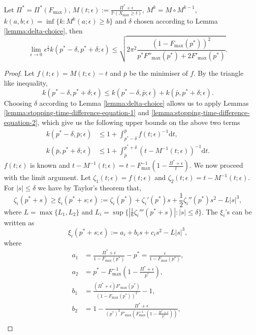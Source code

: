 \documentclass[11pt,a4paper]{article}
\numberwithin{equation}{section}
\begin{document}
\begin{lemma}\label{lemma:technical-upperbound-argument}
Let $\Pi^*=\Pi^*(F_{\max})$, $M(t;\epsilon):=\frac{\Pi^*+\epsilon}{\mathbb{P}(X_{\max}\ge t)}$, $M^k=M\circ M^{k-1}$, $k(a,b;\epsilon)=\inf\{k:M^k(a;\epsilon)\ge b\}$ and $\delta$ chosen according to Lemma \ref{lemma:delta-choice}, then 
    $$
    \lim_{\epsilon\to 0}\epsilon^{\frac{1}{2}}k(p^*-\delta,p^*+\delta;\epsilon)\le\sqrt{2\pi^2\frac{(1-F_{\max}(p^*))^2}{p^*F''_{\max}(p^*)+2F'_{\max}(p^*)}}.
    $$
\end{lemma}
\begin{proof}
    Let $f(t;\epsilon)=M(t;\epsilon)-t$ and $\bar{p}$ be the minimiser of $f$. By the triangle like inequality,
    $$
    k(p^*-\delta,p^*+\delta;\epsilon)\le k(p^*-\delta,\bar{p};\epsilon)+k(\bar{p},p^*+\delta;\epsilon).
    $$
    Choosing $\delta$ according to Lemma \ref{lemma:delta-choice} allows us to apply Lemmas \ref{lemma:stopping-time-difference-equation-1} and \ref{lemma:stopping-time-difference-equation-2}, which give us the following upper bounds on the above two terms
    \begin{align}
        k(p^*-\delta,\bar{p};\epsilon)&\le 1+\int_{p^*-\delta}^{\bar{p}}f(t;\epsilon)^{-1}\mathrm{d}t,\label{eq:bound-left}\\
        k(\bar{p},p^*+\delta;\epsilon)&\le1+\int_{\bar{p}}^{p^*+\delta}\left(t-M^{-1}(t;\epsilon)\right)^{-1}\mathrm{d}t.\label{eq:bound-right}
    \end{align}
    $f(t;\epsilon)$ is known and $t-M^{-1}(t;\epsilon)=t-F^{-1}_{\max}\left(1-\frac{\Pi^*+\epsilon}{t}\right)$.
    We now proceed with the limit argument.    
    Let $\zeta_1(t;\epsilon)=f(t;\epsilon)$ and $\zeta_2(t;\epsilon)=t-M^{-1}(t;\epsilon)$. For $|s|\le \delta$ we have by Taylor's theorem that,
    $$
    \zeta_i(p^*+s)\ge\xi_i(p^*+s;\epsilon):=\zeta_i(p^*)+\zeta_i'(p^*)s+\frac{1}{2}\zeta_i''(p^*)s^2-L|s|^3, 
    $$
    where $L=\max\{L_1,L_2\}$ and $L_i=\sup\{|\frac{1}{6}\zeta_i'''(p^*+s)|:|s|\le\delta\}$. The $\xi_i$'s can be written as
    $$
    \xi_i(p^*+s;\epsilon):=a_i+b_is+c_is^2-L|s|^3,
    $$
    where
    \begin{align*}    
        a_1&=\frac{\Pi^*+\epsilon}{1-F_{\max}(p^*)}-p^*=\frac{\epsilon}{1-F_{\max}(p^*)},\\
        a_2&=p^*-F^{-1}_{\max}\left(1-\frac{\Pi^*+\epsilon}{p^*}\right),\\
        b_1&=\frac{(\Pi^*+\epsilon)F'_{\max}(p^*)}{(1-F_{\max}(p^*))^2}-1,\\
        b_2&=1-\frac{\Pi^*+\epsilon}{(p^*)^2F'_{\max}\left(F^{-1}_{\max}\left(1-\frac{\Pi^*+\epsilon}{p^*}\right)\right)},\\

\end{align*}
\end{proof}
\end{document}
